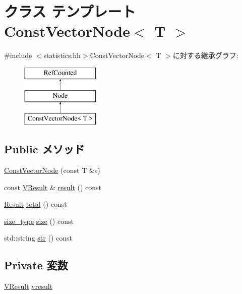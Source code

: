 \hypertarget{classStats_1_1ConstVectorNode}{
\section{クラス テンプレート ConstVectorNode$<$ T $>$}
\label{classStats_1_1ConstVectorNode}
}


{\ttfamily \#include $<$statistics.hh$>$}ConstVectorNode$<$ T $>$に対する継承グラフ:\begin{figure}[H]
\begin{center}
\leavevmode
\includegraphics[height=3cm]{classStats_1_1ConstVectorNode}
\end{center}
\end{figure}
\subsection*{Public メソッド}
\begin{DoxyCompactItemize}
\item 
\hyperlink{classStats_1_1ConstVectorNode_acb62822dfc572500e8f10d000269fd12}{ConstVectorNode} (const T \&s)
\item 
const \hyperlink{classstd_1_1vector}{VResult} \& \hyperlink{classStats_1_1ConstVectorNode_aba312f9e3431b1652f8b3ddf3fe105dc}{result} () const 
\item 
\hyperlink{namespaceStats_ad874d2cfd4b4a29ebd480bb2e67f20ae}{Result} \hyperlink{classStats_1_1ConstVectorNode_a35c6e2ed3fc81b40d69052a062113ead}{total} () const 
\item 
\hyperlink{namespaceStats_ada51e68d31936547d3729c82daf6b7c6}{size\_\-type} \hyperlink{classStats_1_1ConstVectorNode_a503ab01f6c0142145d3434f6924714e7}{size} () const 
\item 
std::string \hyperlink{classStats_1_1ConstVectorNode_a1b9b8885b0880fc4ddf9a2c7d1ca3dc4}{str} () const 
\end{DoxyCompactItemize}
\subsection*{Private 変数}
\begin{DoxyCompactItemize}
\item 
\hyperlink{classstd_1_1vector}{VResult} \hyperlink{classStats_1_1ConstVectorNode_a8f41af856442757ec68f3391333d3eb2}{vresult}
\end{DoxyCompactItemize}
